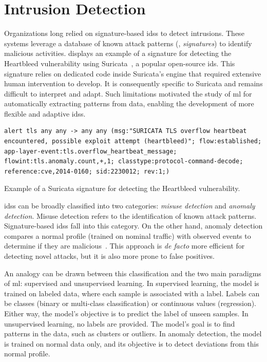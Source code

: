 
\section{Intrusion Detection\label{sec:bg.ids}}

Organizations long relied on signature-based \glspl{ids} to detect intrusions.
These systems leverage a database of known attack patterns (\ie, \emph{signatures}) to identify malicious activities.
 displays an example of a signature for detecting the Heartbleed vulnerability using Suricata~\cite{suricata}, a popular open-source \gls{ids}.
This signature relies on dedicated code inside Suricata's engine that required extensive human intervention to develop.
It is consequently specific to Suricata and remains difficult to interpret and adapt.
Such limitations motivated the study of \gls{ml} for automatically extracting patterns from data, enabling the development of more flexible and adaptive \glspl{ids}.

\begin{listing}
  \begin{lstlisting}[gobble=4]
    alert tls any any -> any any (msg:"SURICATA TLS overflow heartbeat encountered, possible exploit attempt (heartbleed)"; flow:established; app-layer-event:tls.overflow_heartbeat_message; flowint:tls.anomaly.count,+,1; classtype:protocol-command-decode; reference:cve,2014-0160; sid:2230012; rev:1;)
  \end{lstlisting}
  \caption[
    Example of a Suricata signature for detecting the Heartbleed vulnerability.
  ]{
    Example of a Suricata signature for detecting the Heartbleed vulnerability\footnotemark{}.
    \label{lst:suricata} 
  }
\end{listing}


\Glspl{ids} can be broadly classified into two categories: \emph{misuse detection} and \emph{anomaly detection}.
Misuse detection refers to the identification of known attack patterns.
Signature-based \glspl{ids} fall into this category.
On the other hand, anomaly detection compares a normal profile (trained on nominal traffic) with observed events to determine if they are malicious~\cite{garcia-teodoro_Anomalybasednetworkintrusion_2009}.
This approach is \emph{de facto} more efficient for detecting novel attacks, but it is also more prone to false positives.

An analogy can be drawn between this classification and the two main paradigms of \gls{ml}: supervised and unsupervised learning.
In supervised learning, the model is trained on labeled data, where each sample is associated with a label.
Labels can be classes (binary or multi-class classification) or continuous values (regression).
Either way, the model's objective is to predict the label of unseen samples.
In unsupervised learning, no labels are provided.
The model's goal is to find patterns in the data, such as clusters or outliers.
In anomaly detection, the model is trained on normal data only, and its objective is to detect deviations from this normal profile.

